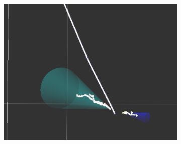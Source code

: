 \begin{figure}[htbp]
\begin{center}
\begin{subfigure}{0.45\textwidth}
\includegraphics[width=0.95\linewidth]{figs/datapi0/evd/Run6058Subrun94Evt4706.png}
\caption{}
\end{subfigure}
\begin{subfigure}{0.45\textwidth}

\end{subfigure}
\end{center}
\end{figure}
